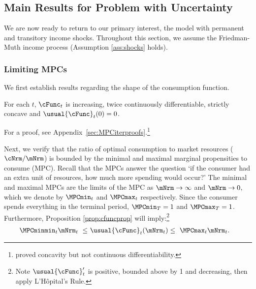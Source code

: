 \documentclass[BufferStockTheory]{subfiles}
\begin{document}
\hypertarget{limsolexists}{}
\subsection{Main Results for Problem with Uncertainty}\label{subsec:limSolExists}

We are now ready to return to our primary interest, the model with permanent and transitory income shocks. Throughout this section, we assume the Friedman-Muth income process (Assumption \ref{ass:shocks} holds). 

\subsubsection{Limiting MPCs}\label{subsubsec:cFuncBounds}

We first establish results regarding the shape of the consumption function. 

\begin{proposition} \label{prop:cfuncprop} For each $t$, $\cFunc_{t}$ is increasing, twice continuously differentiable, strictly concave and $\usual{\cFunc}_{t}(0)=0$.
\end{proposition}

For a proof, see Appendix~\ref{sec:MPCiterproofs}.\footnote{\cite{ckConcavity} proved concavity but not continuous differentiability.}

Next, we verify that the ratio of optimal consumption to market resources ($\cNrm/\mNrm$) is bounded by the minimal and maximal marginal propensities to consume (MPC). Recall that the MPCs answer the question `if the consumer had an extra unit of resources, how much more spending would occur?' The minimal and maximal MPCs are the limits of the MPC as $\mNrm \rightarrow \infty$ and $\mNrm \rightarrow 0$, which we denote by $\MPCmin_{t}$ and $\MPCmax_{t}$ respectively. Since the consumer spends everything in the terminal period, $\MPCmin_{T}=1$ and $\MPCmax_{T}=1$. Furthermore, Proposition \ref{prop:cfuncprop} will imply:\footnote{Note $\usual{\cFunc}_{t}^{\prime}$ is positive, bounded above by 1 and decreasing, then apply L'H\^{o}pital's Rule.}
%
\begin{align}\label{eq:cBounds}
  \MPCminmin_{t} \mNrm_{t} ~ \leq & ~  \usual{\cFunc}_{t}(\mNrm_{t})  \leq  ~ \MPCmax_{t} \mNrm_{t} .
\end{align} 

\begin{comment}
AS to AS: put in explicit proof reference above.
\end{comment}
\end{document}
